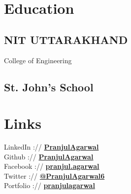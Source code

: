 \documentclass[]{deedy-resume-openfont}
\begin{document}
%
%

%
%

%
%

\begin{minipage}[t]{0.33\textwidth} 


\section{Education} 

\subsection{NIT UTTARAKHAND}
College of Engineering \\
\sectionsep

\subsection{St. John's School}
\sectionsep


\section{Links} 
LinkedIn    ://  \href{https://www.linkedin.com/in/pranjul-agarwal-2000/}{\bf PranjulAgarwal} \\
Github      :// \href{https://github.com/PranjulAgarwal}{\bf PranjulAgarwal} \\
Facebook    :// \href{https://www.facebook.com/pranjul.agarwal.129}{\bf pranjul.agarwal} \\
Twitter     ://  \href{https://twitter.com/PranjulAgarwal6}{\bf @PranjulAgarwal6} \\
Portfolio   ://  \href{https://pranjulagarwal.github.io/}{\bf pranjulagarwal} \\



\end{minipage}
\end{document}
